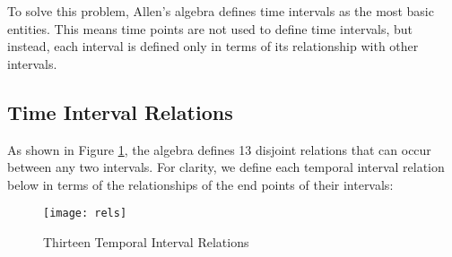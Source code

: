 \documentclass[11pt]{report}
\begin{document}
        To solve this problem, Allen's algebra defines time intervals as the most basic
        entities. This means time points are not used to define time intervals, but
        instead, each interval is defined only in terms of its relationship with other
        intervals.

      \subsection{Time Interval Relations}

        As shown in Figure \ref{fig-rels}, the algebra defines 13 disjoint relations
        that can occur between any two intervals. For clarity, we define each temporal
        interval relation below in terms of the relationships of the end points of
        their intervals:

        \begin{figure}[[tbhp]
          \begin{center}
            \texttt{[image: rels]}
            \caption{Thirteen Temporal Interval Relations}
            \label{fig-rels}
          \end{center}
        \end{figure}
\end{document}
